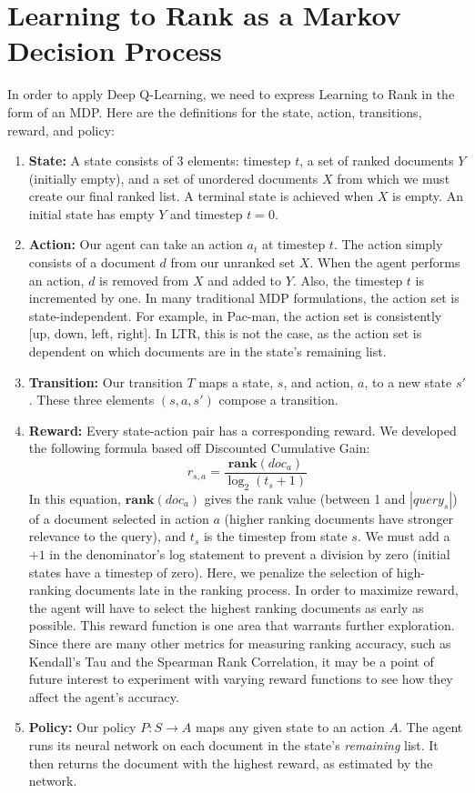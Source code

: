 \documentclass{article}
\begin{document}
\section{Learning to Rank as a Markov Decision Process}
In order to apply Deep Q-Learning, we need to express Learning to Rank in the form of an MDP.
Here are the definitions for the state, action, transitions, reward, and policy: \cite{source1}
\begin{enumerate}
    \item \textbf{State:} A state consists of 3 elements: timestep $t$, a set of ranked documents $Y$ (initially empty), and a set of unordered documents $X$ from which we must create our final ranked list. A terminal state is achieved when $X$ is empty. An initial state has empty $Y$ and timestep $t = 0$. 
    \item \textbf{Action:} Our agent can take an action $a_t$ at timestep $t$. The action simply consists of a document $d$ from our unranked set $X$. When the agent performs an action, $d$ is removed from $X$ and added to $Y$. Also, the timestep $t$ is incremented by one. In many traditional MDP formulations, the action set is state-independent. For example, in Pac-man, the action set is consistently [up, down, left, right]. In LTR, this is not the case, as the action set is dependent on which documents are in the state's remaining list.
    \item \textbf{Transition:} Our transition $T$ maps a state, $s$, and action, $a$, to a new state $s'$. These three elements $(s,a,s')$ compose a transition. 
    \item \textbf{Reward:} Every state-action pair has a corresponding reward. We developed the following formula based off Discounted Cumulative Gain:
    $$r_{s, a} = \frac{\textbf{rank}(doc_a)}{\log_2(t_{s}+1)}$$
    In this equation, $\textbf{rank}(doc_a)$ gives the rank value (between 1 and $|query_s|$) of a document selected in action $a$ (higher ranking documents have stronger relevance to the query), and $t_s$ is the timestep from state $s$. We must add a $+1$ in the denominator's log statement to prevent a division by zero (initial states have a timestep of zero). Here, we penalize the selection of high-ranking documents late in the ranking process. In order to maximize reward, the agent will have to select the highest ranking documents as early as possible. This reward function is one area that warrants further exploration. Since there are many other metrics for measuring ranking accuracy, such as Kendall's Tau and the Spearman Rank Correlation, it may be a point of future interest to experiment with varying reward functions to see how they affect the agent's accuracy.
    \item \textbf{Policy:} Our policy $P: S \rightarrow A$ maps any given state to an action $A$. The agent runs its neural network on each document in the state's \textit{remaining} list. It then returns the document with the highest reward, as estimated by the network. 
\end{enumerate}
\end{document}
